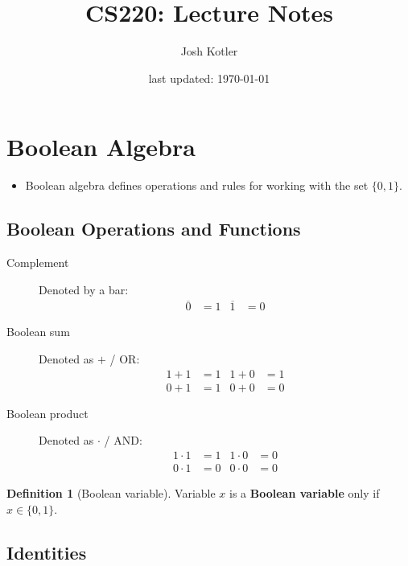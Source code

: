 \documentclass{article}
\title{CS220: Lecture Notes}
\author{Josh Kotler}
\date{last updated: \today}
\theoremstyle{definition}
\newtheorem{definition}{Definition}[section]
\begin{document}
\maketitle
\section{Boolean Algebra}
\begin{itemize}
    \item Boolean algebra defines operations and rules for working with the set $\{0,1\}$.
\end{itemize}
\subsection{Boolean Operations and Functions}
\begin{description}
    \item[Complement] Denoted by a bar:
        \begin{align*}
            \overline{0} &= 1   &   \overline{1} &= 0
        \end{align*}
    \item[Boolean sum] Denoted as $+$ / $\text{OR}$:
        \begin{align*}
            1 + 1 &= 1   &   1 + 0 &= 1   \\
            0 + 1 &= 1   &   0 + 0 &= 0
        \end{align*}
    \item[Boolean product] Denoted as $\cdot$ / $\text{AND}$:
        \begin{align*}
            1 \cdot 1 &= 1   &   1 \cdot 0 &= 0   \\
            0 \cdot 1 &= 0   &   0 \cdot 0 &= 0
        \end{align*}
\end{description}
\begin{definition}[Boolean variable] Variable $x$ is a \textbf{Boolean variable} only
    if $x \in \{0,1\}$.
\end{definition}
\subsection{Identities}
\end{document}
